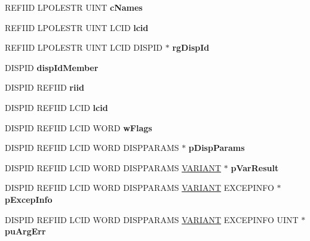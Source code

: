 \begin{DoxyCompactItemize}
R\+E\+F\+I\+ID L\+P\+O\+L\+E\+S\+TR U\+I\+NT {\bfseries c\+Names}
\item 
\mbox{\label{struct_i_ms_tsc_ax_events_vtbl_abd6cf74f1956d2ee022a5fc8d9552846}} 
R\+E\+F\+I\+ID L\+P\+O\+L\+E\+S\+TR U\+I\+NT L\+C\+ID {\bfseries lcid}
\item 
\mbox{\label{struct_i_ms_tsc_ax_events_vtbl_a541785e7747a8abd5ac06c8929517ca0}} 
R\+E\+F\+I\+ID L\+P\+O\+L\+E\+S\+TR U\+I\+NT L\+C\+ID D\+I\+S\+P\+ID $\ast$ {\bfseries rg\+Disp\+Id}
\item 
\mbox{\label{struct_i_ms_tsc_ax_events_vtbl_a82cc85ca7bbcdaee4aa49e9e40b61ab0}} 
D\+I\+S\+P\+ID {\bfseries disp\+Id\+Member}
\item 
\mbox{\label{struct_i_ms_tsc_ax_events_vtbl_a026814a614e5f9c5444757743ba45b13}} 
D\+I\+S\+P\+ID R\+E\+F\+I\+ID {\bfseries riid}
\item 
\mbox{\label{struct_i_ms_tsc_ax_events_vtbl_af41ee3009f415e2a5d0b5dc2148775cf}} 
D\+I\+S\+P\+ID R\+E\+F\+I\+ID L\+C\+ID {\bfseries lcid}
\item 
\mbox{\label{struct_i_ms_tsc_ax_events_vtbl_aa74c0756ad13a592e2a248725ed189fa}} 
D\+I\+S\+P\+ID R\+E\+F\+I\+ID L\+C\+ID W\+O\+RD {\bfseries w\+Flags}
\item 
\mbox{\label{struct_i_ms_tsc_ax_events_vtbl_ad38bf0020f762017e34f32958b13dcb8}} 
D\+I\+S\+P\+ID R\+E\+F\+I\+ID L\+C\+ID W\+O\+RD D\+I\+S\+P\+P\+A\+R\+A\+MS $\ast$ {\bfseries p\+Disp\+Params}
\item 
\mbox{\label{struct_i_ms_tsc_ax_events_vtbl_a4c58a57ab17a1b7c5b3bad27a51f0815}} 
D\+I\+S\+P\+ID R\+E\+F\+I\+ID L\+C\+ID W\+O\+RD D\+I\+S\+P\+P\+A\+R\+A\+MS \hyperlink{structtag_v_a_r_i_a_n_t}{V\+A\+R\+I\+A\+NT} $\ast$ {\bfseries p\+Var\+Result}
\item 
\mbox{\label{struct_i_ms_tsc_ax_events_vtbl_a9d3b0f419b6fd2528c5a65597e8c7c19}} 
D\+I\+S\+P\+ID R\+E\+F\+I\+ID L\+C\+ID W\+O\+RD D\+I\+S\+P\+P\+A\+R\+A\+MS \hyperlink{structtag_v_a_r_i_a_n_t}{V\+A\+R\+I\+A\+NT} E\+X\+C\+E\+P\+I\+N\+FO $\ast$ {\bfseries p\+Excep\+Info}
\item 
\mbox{\label{struct_i_ms_tsc_ax_events_vtbl_a8f5be14051b41b10747ab8044283f637}} 
D\+I\+S\+P\+ID R\+E\+F\+I\+ID L\+C\+ID W\+O\+RD D\+I\+S\+P\+P\+A\+R\+A\+MS \hyperlink{structtag_v_a_r_i_a_n_t}{V\+A\+R\+I\+A\+NT} E\+X\+C\+E\+P\+I\+N\+FO U\+I\+NT $\ast$ {\bfseries pu\+Arg\+Err}
\end{DoxyCompactItemize}


